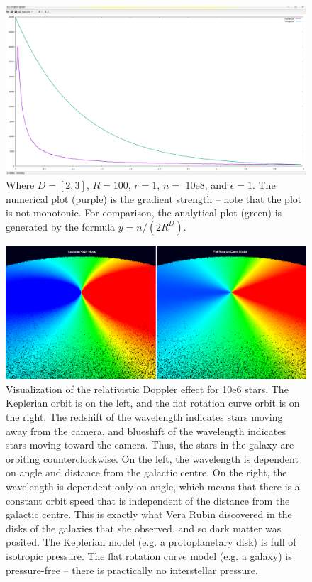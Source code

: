 \documentclass[12pt]{article}
\begin{document}
\begin{figure} 
\centering
\label{fig4}
  \includegraphics[width = 7 in]{numerical_versus_analytical.png}
  \caption{
Where $D = [2, 3]$, $R = 100$, $r = 1$, $n = $ 10e8, and $\epsilon = 1$.
The numerical plot (purple) is the gradient strength -- note that the plot is not monotonic.
For comparison, the analytical plot (green) is generated by the formula $y = n / (2 R^D)$.
}
\end{figure}


\begin{figure} 
\centering
\label{fig6}
  \includegraphics[width = 7 in]{doppler.png}
  \caption{
Visualization of the relativistic Doppler effect for 10e6 stars.
The Keplerian orbit is on the left, and the flat rotation curve orbit is on the right.
The redshift of the wavelength indicates stars moving away from the camera, and blueshift of the wavelength indicates stars moving toward the camera.
Thus, the stars in the galaxy are orbiting counterclockwise.
On the left, the wavelength is dependent on angle and distance from the galactic centre.
On the right, the wavelength is dependent only on angle, which means that there is a constant orbit speed that is independent of the distance from the galactic centre.
This is exactly what Vera Rubin discovered in the disks of the galaxies that she observed, and so dark matter was posited.
The Keplerian model (e.g. a protoplanetary disk) is full of isotropic pressure.
The flat rotation curve model (e.g. a galaxy) is pressure-free -- there is practically no interstellar pressure.
}
\end{figure}
\end{document}
